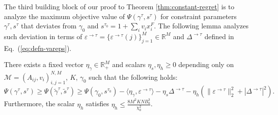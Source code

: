 \documentclass[opre]{informs3aa}
\renewcommand{\tilde}{\widetilde}
\renewcommand{\tilde}{\widetilde}
\begin{document}
The third building block of our proof to Theorem \ref{thm:constant-regret} is to analyze the maximum objective value of $\Psi(\gamma^\tau,s^\tau)$ for
constraint parameters $\gamma^\tau,s^\tau$ that deviates from $\gamma_0$ and $s^{\tau_0}=1+\sum_i v_ix_i^F$.
The following lemma analyzes such deviation in terms of $\varepsilon^{\to\tau}=\{\varepsilon^{\to\tau}(j)\}_{j=1}^M\in\mathbb R^M$ and $\Delta^{\to\tau}$
defined in Eq.~(\ref{eq:defn-vareps}).
\begin{lemma}
There exists a fixed vector $\eta_\gamma\in\mathbb R_+^M$ and scalars $\eta_s,\eta_h\geq 0$ depending only on $\mathcal M=(A_{ij},v_i)_{i,j=1}^{N,M}$, $K$, $\gamma_0$ such that the following holds: 
$$
\Psi(\gamma^\tau,s^\tau) \geq \Psi(\tilde\gamma^\tau,\tilde s^\tau) \geq \Psi(\gamma_0,s^{\tau_0}) - \big\langle \eta_\gamma, \varepsilon^{\to\tau}\big\rangle - \eta_s \Delta^{\to\tau}
- \eta_h(\|\varepsilon^{\to\tau}\|_2^2+|\Delta^{\to\tau}|^2).
$$
Furthermore, the scalar $\eta_h$ satisfies $\eta_h\leq \frac{8 M^2 KN B_0^3}{\chi_0^2}$.
\label{lem:psi-stability}
\end{lemma}
\end{document}
